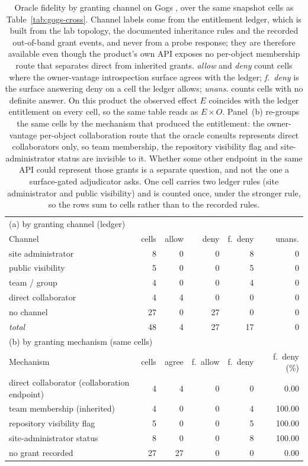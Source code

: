 \begin{table}[t]
\centering
\caption{Oracle fidelity by granting channel on Gogs \GgVersion{}, over the same \GgChCells{} snapshot cells as Table~\ref{tab:gogs-cross}. Channel labels come from the entitlement ledger, which is built from the lab topology, the documented inheritance rules and the recorded out-of-band grant events, and never from a probe response; they are therefore available even though the product's own API exposes no per-object membership route that separates direct from inherited grants. \emph{allow} and \emph{deny} count cells where the owner-vantage introspection surface agrees with the ledger; \emph{f.\ deny} is the surface answering deny on a cell the ledger allows; \emph{unans.} counts cells with no definite answer. On this product the observed effect $E$ coincides with the ledger entitlement on every cell, so the same table reads as $E{\times}O$. Panel~(b) re-groups the same cells by the mechanism that produced the entitlement: the owner-vantage per-object collaboration route that the oracle consults represents direct collaborators only, so team membership, the repository visibility flag and site-administrator status are invisible to it. Whether some other endpoint in the same API could represent those grants is a separate question, and not the one a surface-gated adjudicator asks. One cell carries two ledger rules (site administrator and public visibility) and is counted once, under the stronger rule, so the rows sum to \GgChCells{} cells rather than to the \GgChRules{} recorded rules.}
\label{tab:gogs-channel}
\small
\begin{tabular}{lrrrrr}
\toprule
\multicolumn{6}{l}{(a) by granting channel (ledger)}\\
\addlinespace[2pt]
Channel & cells & allow & deny & f.\ deny & unans. \\
\addlinespace[2pt]
site administrator & 8 & 0 & 0 & 8 & 0 \\
public visibility & 5 & 0 & 0 & 5 & 0 \\
team / group & 4 & 0 & 0 & 4 & 0 \\
direct collaborator & 4 & 4 & 0 & 0 & 0 \\
no channel & 27 & 0 & 27 & 0 & 0 \\
\addlinespace[2pt]
\emph{total} & 48 & 4 & 27 & 17 & 0 \\
\midrule
\multicolumn{6}{l}{(b) by granting mechanism (same cells)}\\
\addlinespace[2pt]
Mechanism & cells & agree & f.\ allow & f.\ deny & f.\ deny (\%) \\
\addlinespace[2pt]
direct collaborator (collaboration endpoint) & 4 & 4 & 0 & 0 & 0.00 \\
team membership (inherited) & 4 & 0 & 0 & 4 & 100.00 \\
repository visibility flag & 5 & 0 & 0 & 5 & 100.00 \\
site-administrator status & 8 & 0 & 0 & 8 & 100.00 \\
no grant recorded & 27 & 27 & 0 & 0 & 0.00 \\
\bottomrule
\end{tabular}
\end{table}
